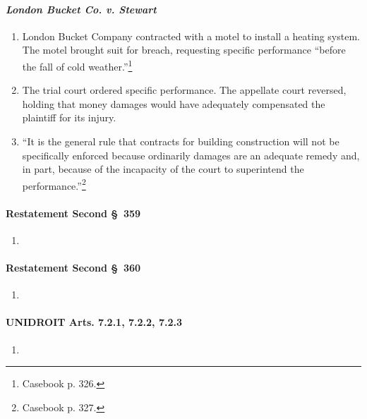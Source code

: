\paragraph{\emph{London Bucket Co. v. Stewart}}

\begin{enumerate}
    \item London Bucket Company contracted with a motel to install a heating 
    system. The motel brought suit for breach, requesting specific performance 
    ``before the fall of cold weather.''\footnote{Casebook p. 326.}
    \item The trial court ordered specific performance. The appellate court 
    reversed, holding that money damages would have adequately compensated the 
    plaintiff for its injury.
    \item ``It is the general rule that contracts for building construction 
    will not be specifically enforced because ordinarily damages are an 
    adequate remedy and, in part, because of the incapacity of the court to 
    superintend the performance.''\footnote{Casebook p. 327.}
\end{enumerate}

\paragraph{Restatement Second \S\ 359}

\begin{enumerate}
    \item %
\end{enumerate}

\paragraph{Restatement Second \S\ 360}

\begin{enumerate}
    \item %
\end{enumerate}

\paragraph{UNIDROIT Arts. 7.2.1, 7.2.2, 7.2.3}

\begin{enumerate}
    \item %
\end{enumerate}

